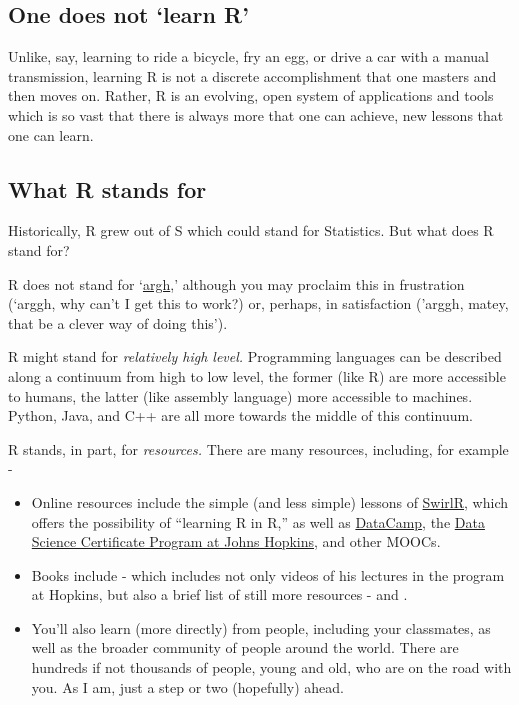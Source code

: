 \documentclass[]{book}
\providecommand{\tightlist}{%
  \setlength{\itemsep}{0pt}\setlength{\parskip}{0pt}}
\theoremstyle{definition}
\theoremstyle{definition}
\theoremstyle{definition}
\theoremstyle{remark}
\begin{document}
\subsection{\texorpdfstring{One does not `learn
R'}{One does not learn R}}\label{one-does-not-learn-r}

Unlike, say, learning to ride a bicycle, fry an egg, or drive a car with
a manual transmission, learning R is not a discrete accomplishment that
one masters and then moves on. Rather, R is an evolving, open system of
applications and tools which is so vast that there is always more that
one can achieve, new lessons that one can learn.

\subsection{What R stands for}\label{what-r-stands-for}

Historically, R grew out of S which could stand for Statistics. But what
does R stand for?

R does not stand for
`\href{https://www.urbandictionary.com/define.php?term=ARGH}{argh},'
although you may proclaim this in frustration (`arggh, why can't I get
this to work?) or, perhaps, in satisfaction ('arggh, matey, that be a
clever way of doing this').

R might stand for \emph{relatively high level.} Programming languages
can be described along a continuum from high to low level, the former
(like R) are more accessible to humans, the latter (like assembly
language) more accessible to machines. Python, Java, and C++ are all
more towards the middle of this continuum.

R stands, in part, for \emph{resources.} There are many resources,
including, for example -

\begin{itemize}
\tightlist
\item
  Online resources include the simple (and less simple) lessons of
  \href{http://swirlstats.com/}{SwirlR}, which offers the possibility of
  ``learning R in R,'' as well as
  \href{https://www.datacamp.com/home}{DataCamp}, the
  \href{https://www.coursera.org/specializations/jhu-data-science}{Data
  Science Certificate Program at Johns Hopkins,} and other MOOCs.\\
\item
  Books include \citet{peng2015r} - which includes not only videos of
  his lectures in the program at Hopkins, but also a brief list of still
  more resources - and \citet{wickham2016r}.
\item
  You'll also learn (more directly) from people, including your
  classmates, as well as the broader community of people around the
  world. There are hundreds if not thousands of people, young and old,
  who are on the road with you. As I am, just a step or two (hopefully)
  ahead.
\end{itemize}
\end{document}
